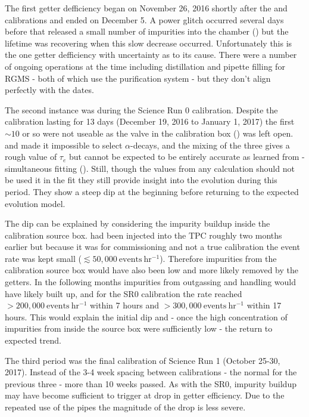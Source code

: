 The first getter defficiency
began on November 26, 2016 shortly after the \ambe and \metakr calibrations and ended on December 5.  A power glitch occurred several
days before that released a small number of impurities into the chamber
() but the lifetime was recovering when this slow decrease
occurred.  Unfortunately this is the one getter defficiency with uncertainty as to its cause.  There were a number of ongoing operations
at the time including  distillation and pipette filling for RGMS - both of which use the purification system - but they don't
align perfectly with the dates.

The second instance was during the Science Run 0 \rncal calibration.  Despite the calibration lasting for 13 days (December 19, 2016 to
January 1, 2017) the first ${\sim} 10$ or
so were not useable as the valve in the calibration box () was left
open.  \rncal and  made it impossible to select  $\alpha$-decays, and the mixing of the three gives a rough
value of $\tau_e$ but cannot be expected to be entirely accurate as learned from \rnbkg- simultaneous fitting
().  Still, though the values from any calculation should not be used it in the
fit they still provide insight into the evolution during this period.  They show a steep dip at the beginning before returning to the
expected evolution model.

The dip can be explained by considering the impurity buildup inside the calibration source box.  \rncal had been injected into the TPC
roughly two months earlier but because it was for commissioning and not a true calibration the event rate was kept small
($\lesssim 50,000\ \mathrm{events\ hr^{-1}}$).  Therefore
impurities from the calibration source box would have also been low and more likely removed by the getters.  In the following months
impurities from outgassing and handling would have likely built up, and for the SR0 calibration the rate reached
$> 200,000\ \mathrm{events\ hr^{-1}}$ within 7 hours and $> 300,000\ \mathrm{events\ hr^{-1}}$ within 17 hours.  This would explain the
initial dip and - once the high concentration of impurities from inside the source box were sufficiently low - the return to expected
trend.

The third period was the final \rncal calibration of Science Run 1 (October 25-30, 2017).  Instead of the 3-4 week spacing between
calibrations - the normal for the previous three - more than 10 weeks passed.  As with the SR0, impurity buildup may have become
sufficient to trigger at drop in getter efficiency.  Due to the repeated use of the pipes the magnitude of the drop is less severe.

